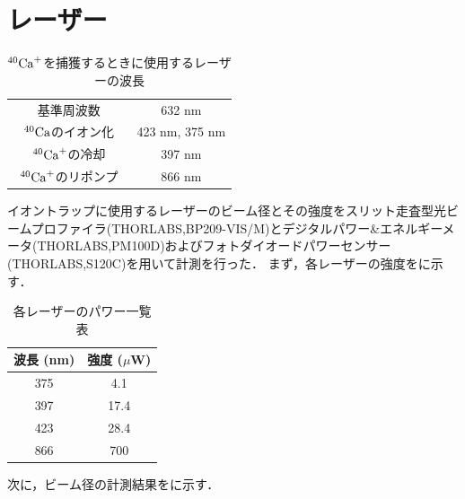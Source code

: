 \section{レーザー}
\begin{table}[h]
	\centering
		\caption{$^{40}{\rm Ca}^+$を捕獲するときに使用するレーザーの波長}
		\label{tb:use_laser}
			\begin{tabular}{c|c} \hline \hline
				基準周波数 & 632 nm \\ 
				$^{40}{\rm Ca}$のイオン化 & 423 nm, 375 nm \\
				$^{40}{\rm Ca}^+$の冷却 & 397 nm \\
				$^{40}{\rm Ca}^+$のリポンプ　& 866 nm \\ \hline 
			\end{tabular}
\end{table}
イオントラップに使用するレーザーのビーム径とその強度をスリット走査型光ビームプロファイラ(THORLABS,BP209-VIS/M)とデジタルパワー\&エネルギーメータ(THORLABS,PM100D)およびフォトダイオードパワーセンサー(THORLABS,S120C)を用いて計測を行った．
まず，各レーザーの強度をに示す．

\begin{table}[h]
	\begin{center}
		\caption{各レーザーのパワー一覧表}
		\label{tab:AllLaserPower}
		\begin{tabular}{c|c} \hline \hline
			波長 (nm) & 強度 ($\mu$W) \\ \hline
			375 &4.1 \\ \hline
			397 &17.4 \\ \hline
			423 &28.4 \\ \hline
			866 &700 \\ \hline
		\end{tabular}
	\end{center}
\end{table}

次に，ビーム径の計測結果をに示す．

